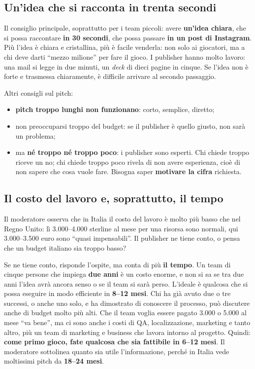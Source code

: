 \subsection{Un'idea che si racconta in trenta secondi}

Il consiglio principale, soprattutto per i team piccoli: avere \textbf{un'idea
chiara}, che si possa raccontare \textbf{in 30 secondi}, che possa passare
\textbf{in un post di Instagram}. Più l'idea è chiara e cristallina, più è facile
venderla: non solo ai giocatori, ma a chi deve darti ``mezzo milione'' per fare
il gioco. I publisher hanno molto lavoro: una mail si legge in due minuti, un
\emph{deck} di dieci pagine in cinque. Se l'idea non è forte e trasmessa
chiaramente, è difficile arrivare al secondo passaggio.

Altri consigli sul pitch:
\begin{itemize}
  \item \textbf{pitch troppo lunghi non funzionano}: corto, semplice, diretto;
  \item non preoccuparsi troppo del budget: se il publisher è quello giusto, non
        sarà un problema;
  \item ma \textbf{né troppo né troppo poco}: i publisher sono esperti. Chi chiede
        troppo riceve un no; chi chiede troppo poco rivela di non avere
        esperienza, cioè di non sapere che cosa vuole fare. Bisogna saper
        \textbf{motivare la cifra} richiesta.
\end{itemize}

\subsection{Il costo del lavoro e, soprattutto, il tempo}

Il moderatore osserva che in Italia il costo del lavoro è molto più basso che nel
Regno Unito: lì 3.000--4.000 sterline al mese per una risorsa sono normali, qui
3.000--3.500 euro sono ``quasi impensabili''. Il publisher ne tiene conto, o pensa
che un budget italiano sia troppo basso?

Se ne tiene conto, risponde l'ospite, ma conta di più \textbf{il tempo}. Un team di
cinque persone che impiega \textbf{due anni} è un costo enorme, e non si sa se tra
due anni l'idea avrà ancora senso o se il team si sarà perso. L'ideale è qualcosa
che si possa eseguire in modo efficiente in \textbf{8--12 mesi}. Chi ha già avuto
due o tre successi, o anche uno solo, e ha dimostrato di conoscere il processo, può
discutere anche di budget molto più alti. Che il team voglia essere pagato 3.000 o
5.000 al mese ``va bene'', ma ci sono anche i costi di QA, localizzazione,
marketing e tanto altro, più un team di marketing e business che lavora intorno al
progetto. Quindi: \textbf{come primo gioco, fate qualcosa che sia fattibile in
6--12 mesi}. Il moderatore sottolinea quanto sia utile l'informazione, perché in
Italia vede moltissimi pitch da \textbf{18--24 mesi}.

